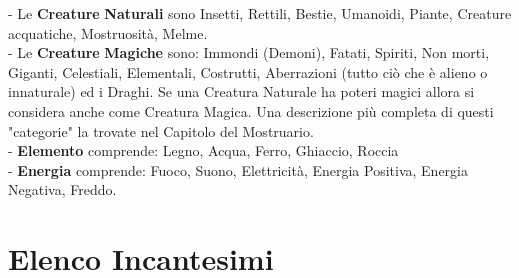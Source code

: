 \documentclass[12pt,a4paper,twoside,openany]{book}
\begin{document}
\begin{multicols}{2}
- Le \textbf{Creature} \textbf{Naturali} sono Insetti, Rettili, Bestie, Umanoidi, Piante, Creature acquatiche, Mostruosità, Melme.\\

- Le \textbf{Creature} \textbf{Magiche} sono: Immondi (Demoni), Fatati, Spiriti, Non morti, Giganti, Celestiali, Elementali, Costrutti, Aberrazioni (tutto ciò che è alieno o innaturale) ed i  Draghi.
Se una Creatura Naturale ha poteri magici allora si considera anche come Creatura Magica. Una descrizione più completa di questi "categorie" la trovate nel Capitolo del Mostruario.\\

- \textbf{Elemento} comprende: Legno, Acqua, Ferro, Ghiaccio, Roccia\\

- \textbf{Energia} comprende: Fuoco, Suono, Elettricità, Energia Positiva, Energia Negativa, Freddo.


\end{multicols}

\pagebreak

\section{Elenco Incantesimi}
\end{document}
